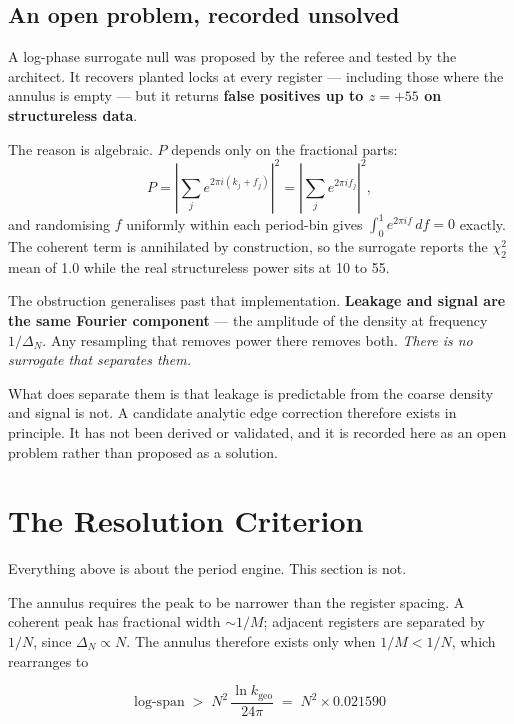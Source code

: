 \documentclass[11pt, letterpaper, openany]{book}
\newcommand{\kgeo}{k_{\mathrm{geo}}}
\begin{document}
\subsection{An open problem, recorded unsolved}

A log-phase surrogate null was proposed by the referee and tested by the architect. It
recovers planted locks at every register --- including those where the annulus is empty --- but
it returns \textbf{false positives up to $z = +55$ on structureless data}.

The reason is algebraic. $P$ depends only on the fractional parts:
\[
P = \left| \sum_j e^{2\pi i (k_j + f_j)} \right|^2 = \left| \sum_j e^{2\pi i f_j} \right|^2 ,
\]
and randomising $f$ uniformly within each period-bin gives $\int_0^1 e^{2\pi i f}\,df = 0$
exactly. The coherent term is annihilated by construction, so the surrogate reports the
$\chi^2_2$ mean of 1.0 while the real structureless power sits at 10 to 55.

\begin{warningbox}
The obstruction generalises past that implementation. \textbf{Leakage and signal are the same
Fourier component} --- the amplitude of the density at frequency $1/\Delta_N$. Any resampling
that removes power there removes both. \emph{There is no surrogate that separates them.}

\medskip
\noindent What does separate them is that leakage is predictable from the coarse density and
signal is not. A candidate analytic edge correction therefore exists in principle. It has not
been derived or validated, and it is recorded here as an open problem rather than proposed as a
solution.
\end{warningbox}

\section{The Resolution Criterion}

Everything above is about the period engine. This section is not.

The annulus requires the peak to be narrower than the register spacing. A coherent peak has
fractional width $\sim 1/M$; adjacent registers are separated by $1/N$, since
$\Delta_N \propto N$. The annulus therefore exists only when $1/M < 1/N$, which rearranges to

\begin{equation}
\boxed{\ \ \text{log-span} \;>\; N^{2}\,\frac{\ln \kgeo}{24\pi} \;=\; N^{2} \times 0.021590 \ \ }
\label{eq:resolution}
\end{equation}
\end{document}
